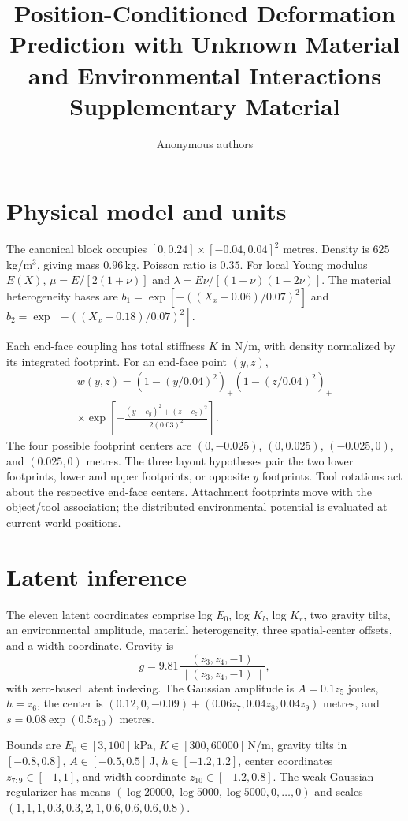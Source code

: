 \documentclass[10pt,twocolumn,letterpaper]{article}
\title{Position-Conditioned Deformation Prediction with Unknown Material and Environmental Interactions\\Supplementary Material}
\author{Anonymous authors}
\begin{document}
\maketitle
\section{Physical model and units}
The canonical block occupies $[0,0.24]\times[-0.04,0.04]^2$ metres. Density is $625$\,kg/m$^3$, giving mass $0.96$\,kg. Poisson ratio is $0.35$. For local Young modulus $E(X)$, $\mu=E/[2(1+\nu)]$ and $\lambda=E\nu/[(1+\nu)(1-2\nu)]$. The material heterogeneity bases are $b_1=\exp[-((X_x-0.06)/0.07)^2]$ and $b_2=\exp[-((X_x-0.18)/0.07)^2]$.

Each end-face coupling has total stiffness $K$ in N/m, with density normalized by its integrated footprint. For an end-face point $(y,z)$,
\begin{multline}
 w(y,z)=\left(1-(y/0.04)^2\right)_+\left(1-(z/0.04)^2\right)_+\\
 \times\exp\left[-\frac{(y-c_y)^2+(z-c_z)^2}{2(0.03)^2}\right].
\end{multline}
The four possible footprint centers are $(0,-0.025)$, $(0,0.025)$, $(-0.025,0)$, and $(0.025,0)$ metres. The three layout hypotheses pair the two lower footprints, lower and upper footprints, or opposite $y$ footprints. Tool rotations act about the respective end-face centers. Attachment footprints move with the object/tool association; the distributed environmental potential is evaluated at current world positions.

\section{Latent inference}
The eleven latent coordinates comprise log $E_0$, log $K_l$, log $K_r$, two gravity tilts, an environmental amplitude, material heterogeneity, three spatial-center offsets, and a width coordinate. Gravity is
\begin{equation}
 g=9.81\frac{(z_3,z_4,-1)}{\|(z_3,z_4,-1)\|},
\end{equation}
with zero-based latent indexing. The Gaussian amplitude is $A=0.1z_5$ joules, $h=z_6$, the center is $(0.12,0,-0.09)+(0.06z_7,0.04z_8,0.04z_9)$ metres, and $s=0.08\exp(0.5z_{10})$ metres.

Bounds are $E_0\in[3,100]$\,kPa, $K\in[300,60000]$\,N/m, gravity tilts in $[-0.8,0.8]$, $A\in[-0.5,0.5]$\,J, $h\in[-1.2,1.2]$, center coordinates $z_{7:9}\in[-1,1]$, and width coordinate $z_{10}\in[-1.2,0.8]$. The weak Gaussian regularizer has means $(\log20000,\log5000,\log5000,0,\ldots,0)$ and scales $(1,1,1,0.3,0.3,2,1,0.6,0.6,0.6,0.8)$.
\end{document}
